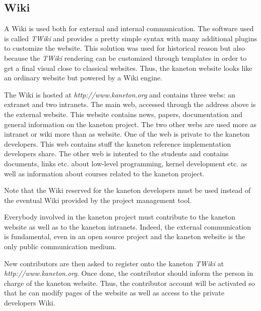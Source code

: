 %
%
%
%
%
%

%
%

\subsection{Wiki}
\label{section:wiki}

A Wiki is used both for external and internal communication. The software
used is called \textit{TWiki} and provides a pretty simple syntax with
many additional plugins to customize the website. This solution was used
for historical reason but also because the \textit{TWiki} rendering can
be customized through templates in order to get a final visual close to
classical websites. Thus, the kaneton website looks like an ordinary
website but powered by a Wiki engine.

The Wiki is hosted at \textit{http://www.kaneton.org} and contains three
webs: an extranet and two intranets. The main web, accessed through the
address above is the external website. This website contains news, papers,
documentation and general information on the kaneton project. The two other
webs are used more as intranet or wiki more than as website. One of the web
is private to the kaneton developers. This web contains stuff the kaneton
reference implementation developers share. The other web is intented to the
students and contains documents, links etc. about low-level programming, kernel
development etc. as well as information about courses related to the
kaneton project.

Note that the Wiki reserved for the kaneton developers must be used
instead of the eventual Wiki provided by the project management tool.

Everybody involved in the kaneton project must contribute to the kaneton
website as well as to the kaneton intranets. Indeed, the external communication
is fundamental, even in an open source project and the kaneton website is
the only public communication medium.

New contributors are then asked to register onto the kaneton \textit{TWiki}
at \textit{http://www.kaneton.org}. Once done, the contributor should
inform the person in charge of the kaneton website. Thus, the contributor
account will be activated so that he can modify pages of the website as
well as access to the private developers Wiki.
